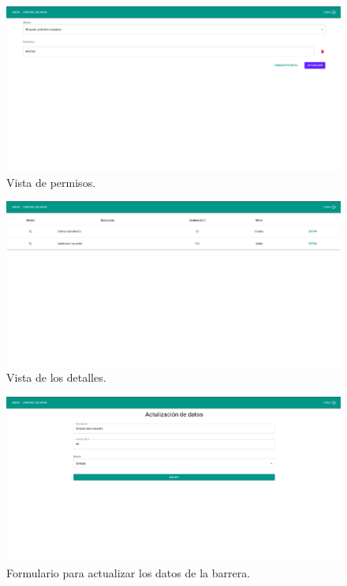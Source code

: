 \begin{figure}
    \centering
    \includegraphics[width=\textwidth]{imgs/server/in-type.png}
    \caption{Vista de permisos.}
    \label{fig:in-type}
\end{figure}
\begin{figure}
    \centering
    \includegraphics[width=\textwidth]{imgs/server/client-barriers-details.png}
    \caption{Vista de los detalles.}
    \label{fig:barrier-details}
\end{figure}

\begin{figure}
    \centering
    \includegraphics[width=\textwidth]{imgs/server/barrier-update-data.png}
    \caption{Formulario para actualizar los datos de la barrera.}
    \label{fig:update-barrier}
\end{figure}

